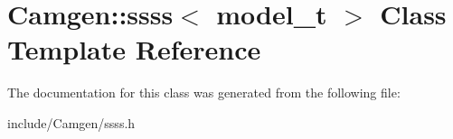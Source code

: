 \hypertarget{a00517}{}\section{Camgen\+:\+:ssss$<$ model\+\_\+t $>$ Class Template Reference}
\label{a00517}


The documentation for this class was generated from the following file\+:\begin{DoxyCompactItemize}
\item 
include/\+Camgen/ssss.\+h\end{DoxyCompactItemize}

